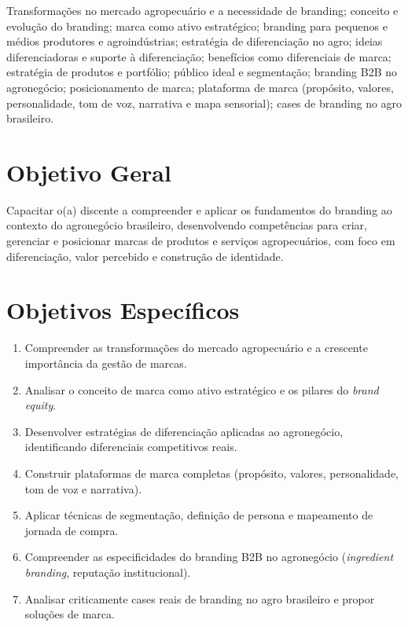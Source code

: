 \documentclass[11pt,a4paper]{article}
\begin{document}
\begin{tcolorbox}[ementabox]
Transformações no mercado agropecuário e a necessidade de branding; conceito e evolução do branding; marca como ativo estratégico; branding para pequenos e médios produtores e agroindústrias; estratégia de diferenciação no agro; ideias diferenciadoras e suporte à diferenciação; benefícios como diferenciais de marca; estratégia de produtos e portfólio; público ideal e segmentação; branding B2B no agronegócio; posicionamento de marca; plataforma de marca (propósito, valores, personalidade, tom de voz, narrativa e mapa sensorial); cases de branding no agro brasileiro.
\end{tcolorbox}


\section*{Objetivo Geral}

Capacitar o(a) discente a compreender e aplicar os fundamentos do branding ao contexto do agronegócio brasileiro, desenvolvendo competências para criar, gerenciar e posicionar marcas de produtos e serviços agropecuários, com foco em diferenciação, valor percebido e construção de identidade.

\section*{Objetivos Específicos}

\begin{enumerate}

\item Compreender as transformações do mercado agropecuário e a crescente importância da gestão de marcas.

\item Analisar o conceito de marca como ativo estratégico e os pilares do \textit{brand equity}.

\item Desenvolver estratégias de diferenciação aplicadas ao agronegócio, identificando diferenciais competitivos reais.

\item Construir plataformas de marca completas (propósito, valores, personalidade, tom de voz e narrativa).

\item Aplicar técnicas de segmentação, definição de persona e mapeamento de jornada de compra.

\item Compreender as especificidades do branding B2B no agronegócio (\textit{ingredient branding}, reputação institucional).

\item Analisar criticamente cases reais de branding no agro brasileiro e propor soluções de marca.

\end{enumerate}
\end{document}
